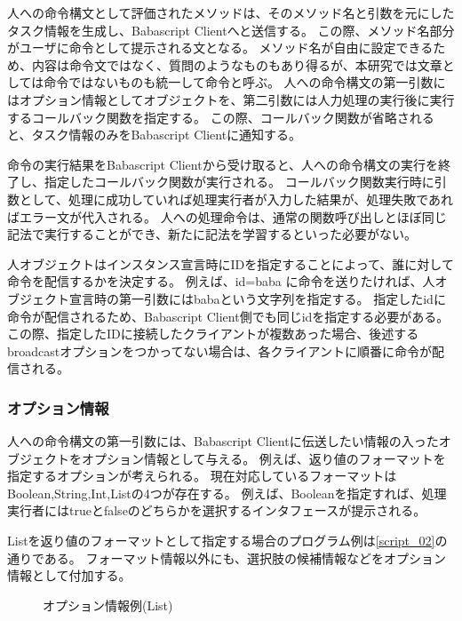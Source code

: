 \documentclass[twoside]{wiss}
\begin{document}
人への命令構文として評価されたメソッドは、そのメソッド名と引数を元にしたタスク情報を生成し、Babascript Clientへと送信する。
この際、メソッド名部分がユーザに命令として提示される文となる。
メソッド名が自由に設定できるため、内容は命令文ではなく、質問のようなものもあり得るが、本研究では文章としては命令ではないものも統一して命令と呼ぶ。
人への命令構文の第一引数にはオプション情報としてオブジェクトを、第二引数には人力処理の実行後に実行するコールバック関数を指定する。
この際、コールバック関数が省略されると、タスク情報のみをBabascript Clientに通知する。

命令の実行結果をBabascript Clientから受け取ると、人への命令構文の実行を終了し、指定したコールバック関数が実行される。
コールバック関数実行時に引数として、処理に成功していれば処理実行者が入力した結果が、処理失敗であればエラー文が代入される。
人への処理命令は、通常の関数呼び出しとほぼ同じ記法で実行することができ、新たに記法を学習するといった必要がない。

人オブジェクトはインスタンス宣言時にIDを指定することによって、誰に対して命令を配信するかを決定する。
例えば、id=baba に命令を送りたければ、人オブジェクト宣言時の第一引数にはbabaという文字列を指定する。
指定したidに命令が配信されるため、Babascript Client側でも同じidを指定する必要がある。
この際、指定したIDに接続したクライアントが複数あった場合、後述するbroadcastオプションをつかってない場合は、各クライアントに順番に命令が配信される。
  
\subsubsection{オプション情報}
人への命令構文の第一引数には、Babascript Clientに伝送したい情報の入ったオブジェクトをオプション情報として与える。
例えば、返り値のフォーマットを指定するオプションが考えられる。
現在対応しているフォーマットはBoolean,String,Int,Listの4つが存在する。
例えば、Booleanを指定すれば、処理実行者にはtrueとfalseのどちらかを選択するインタフェースが提示される。

Listを返り値のフォーマットとして指定する場合のプログラム例は\ref{script_02}の通りである。
フォーマット情報以外にも、選択肢の候補情報などをオプション情報として付加する。

\begin{figure}[!h]  
  \centering
  \caption{オプション情報例(List)}
  \label{scrpt_02}
\end{figure}
\end{document}
